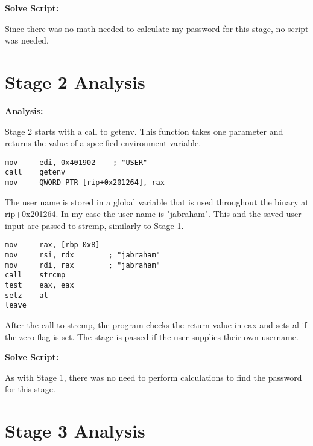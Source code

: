 \documentclass{article}
\begin{document}
\begin{flushleft}
\textbf{Solve Script:}
\vspace{.5pc}
\end{flushleft}
\par
Since there was no math needed to calculate my password for this stage, no 
script was needed.

\newpage
\section{Stage 2 Analysis}
\begin{flushleft}
\vspace{.5pc}
\end{flushleft}

\begin{flushleft}
\textbf{Analysis:}
\vspace{.5pc}
\end{flushleft}

\par
Stage 2 starts with a call to getenv.  This function takes one parameter and 
returns the value of a specified environment variable.
\begin{lstlisting}
mov     edi, 0x401902    ; "USER"
call    getenv
mov     QWORD PTR [rip+0x201264], rax
\end{lstlisting}
\par
The user name is stored in a global variable that is used throughout the 
binary at rip+0x201264.  In my case the user name is "jabraham".  This and the 
saved user input are passed to strcmp, similarly to Stage 1.
\begin{lstlisting}
mov     rax, [rbp-0x8]
mov     rsi, rdx        ; "jabraham"
mov     rdi, rax        ; "jabraham"
call    strcmp
test    eax, eax
setz    al
leave
\end{lstlisting}
\par
After the call to strcmp, the program checks the return value in eax and sets 
al if the zero flag is set.  The stage is passed if the user supplies their 
own username.

\begin{flushleft}
\textbf{Solve Script:}
\vspace{.5pc}
\end{flushleft}
\par
As with Stage 1, there was no need to perform calculations to find the 
password for this stage.

\newpage
\section{Stage 3 Analysis}
\begin{flushleft}
\vspace{.5pc}
\end{flushleft}
\end{document}
